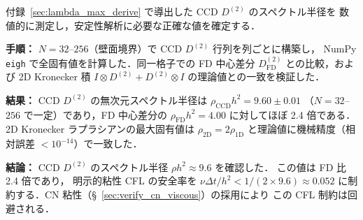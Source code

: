 付録~\ref{sec:lambda_max_derive} で導出した CCD $D^{(2)}$ のスペクトル半径を
数値的に測定し，安定性解析に必要な正確な値を確定する．

\noindent\textbf{手順：}
$N = 32$--$256$（壁面境界）で CCD $D^{(2)}$ 行列を列ごとに構築し，
NumPy \texttt{eigh} で全固有値を計算した．同一格子での FD 中心差分
$D^{(2)}_{\mathrm{FD}}$ との比較，および 2D Kronecker 積
$I \otimes D^{(2)} + D^{(2)} \otimes I$ の理論値との一致を検証した．

\noindent\textbf{結果：}
CCD $D^{(2)}$ の無次元スペクトル半径は $\rho_{\mathrm{CCD}} h^2 = 9.60 \pm 0.01$
（$N = 32$--$256$ で一定）であり，FD 中心差分の $\rho_{\mathrm{FD}} h^2 = 4.00$
に対してほぼ 2.4 倍である．2D Kronecker ラプラシアンの最大固有値は
$\rho_{\mathrm{2D}} = 2\rho_{\mathrm{1D}}$ と理論値に機械精度（相対誤差 $< 10^{-14}$）で一致した．

\noindent\textbf{結論：}
CCD $D^{(2)}$ のスペクトル半径 $\rho h^2 \approx 9.6$ を確認した．
この値は FD 比 2.4 倍であり，
明示的粘性 CFL の安全率を $\nu\Delta t / h^2 < 1/(2 \times 9.6) \approx 0.052$
に制約する．CN 粘性（§~\ref{sec:verify_cn_viscous}）の採用により
この CFL 制約は回避される．
